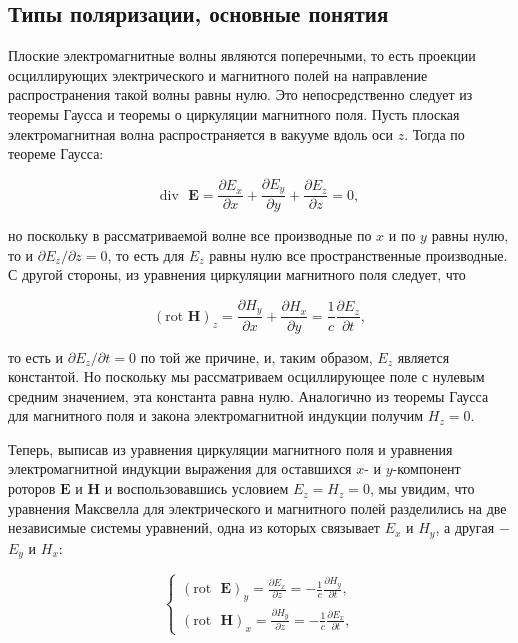 \documentclass[a4paper,12pt]{article} %
\begin{document}
\subsection{Типы поляризации, основные понятия}
\hfill \break Плоские электромагнитные волны являются поперечными, то есть проекции осциллирующих электрического и магнитного полей на направление распространения такой волны равны нулю. Это непосредственно следует из теоремы Гаусса и теоремы о циркуляции магнитного поля. Пусть плоская электромагнитная волна распространяется в вакууме вдоль оси $z$. Тогда по теореме Гаусса:

$$
\text{div} \text{ } {\textbf{E}} = \frac {\partial E_{x}} {\partial x} + \frac {\partial E_{y}} {\partial y} + \frac {\partial E_{z}} {\partial z} = 0,
$$

\hfill \break но поскольку в рассматриваемой волне все производные по $x$ и по $y$ равны нулю, то и $\partial E_{z} / \partial z = 0$, то есть для $E_{z}$ равны нулю все пространственные производные. С другой стороны, из уравнения циркуляции магнитного поля следует, что 

$$
(\text{rot } {\textbf{H}})_{z} = \frac {\partial H_{y}} {\partial x} + \frac {\partial H_{x}} {\partial y} = \frac {1}{c} \frac {\partial E_{z}} {\partial t},
$$

\hfill \break то есть и $\partial E_{z} / \partial t = 0$ по той же причине, и, таким образом, $E_{z}$ является константой. Но поскольку мы рассматриваем осциллирующее поле с нулевым средним значением, эта константа равна нулю. Аналогично из теоремы Гаусса для магнитного поля и закона электромагнитной индукции получим $H_{z} = 0$.

\hfill \break Теперь, выписав из уравнения циркуляции магнитного поля и уравнения электромагнитной индукции выражения для оставшихся $x$- и $y$-компонент роторов $\textbf{E}$ и $\textbf{H}$ и воспользовавшись условием $E_{z} = H_{z} = 0$, мы увидим, что уравнения Максвелла для электрического и магнитного полей разделились на две независимые системы уравнений, одна из которых связывает $E_{x}$ и $H_{y}$, а другая $-$ $E_{y}$ и $H_{x}$:

$$
\begin{cases}
(\text{rot} \text{ } \textbf{E})_{y} = \frac {\partial E_{x}} {\partial z} = - \frac{1}{c} \frac {\partial H_{y}} {\partial t},
\\
(\text{rot} \text{ } \textbf{H})_{x} = \frac {\partial H_{y}} {\partial z} = - \frac{1}{c} \frac {\partial E_{x}} {\partial t},
\end{cases}
$$
\end{document}

